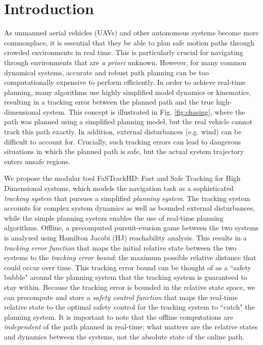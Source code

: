 \section{Introduction}
 As unmanned aerial vehicles (UAVs) and other autonomous systems become more commonplace, it is essential that they be able to plan safe motion paths through crowded environments in real time. This is particularly crucial for navigating through environments that are \textit{a priori} unknown. However, for many common dynamical systems, accurate and robust path planning can be too computationally expensive to perform efficiently. In order to achieve real-time planning, many algorithms use highly simplified model dynamics or kinematics, resulting in a tracking error between the planned path and the true high-dimensional system. This concept is illustrated in Fig. \ref{fig:chasing}, where the path was planned using a simplified planning model, but the real vehicle cannot track this path exactly. In addition, external disturbances (e.g. wind) can be difficult to account for. Crucially, such tracking errors can lead to dangerous situations in which the planned path is safe, but the actual system trajectory enters unsafe regions.
 


We propose the modular tool FaSTrackHD: Fast and Safe Tracking for High Dimensional systems, which models the navigation task as a sophisticated \textit{tracking system} that pursues a simplified \textit{planning system}. The tracking system accounts for complex system dynamics as well as bounded external disturbances, while the simple planning system enables the use of real-time planning algorithms. Offline, a precomputed pursuit-evasion game between the two systems is analyzed using Hamilton Jacobi (HJ) reachability analysis. This results in a \textit{tracking error function} that maps the initial relative state between the two systems to the \textit{tracking error bound}: the maximum possible relative distance that could occur over time. This tracking error bound can be thought of as a ``safety bubble" around the planning system that the tracking system is guaranteed to stay within. Because the tracking error is bounded in the relative state space, we can precompute and store a \textit{safety control function} that  maps the real-time relative state to the optimal safety control for the tracking system to ``catch" the planning system. It is important to note that the offline computations are \textit{independent} of the path planned in real-time; what matters are the relative states and dynamics between the systems, not the absolute state of the online path.

